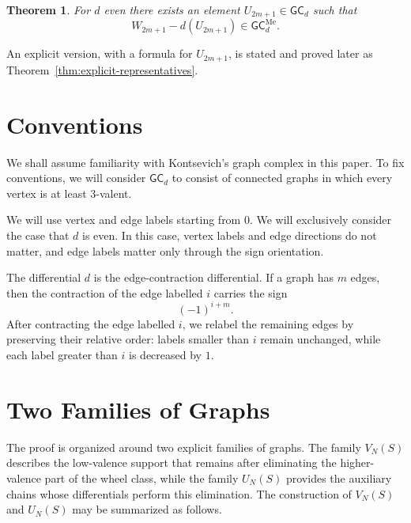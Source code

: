 \documentclass[11pt]{article}
\theoremstyle{definition}
\theoremstyle{plain}
\newtheorem*{maintheorem}{Theorem}
\newcommand{\GC}{\mathsf{GC}}
\begin{document}
\begin{maintheorem}
For $d$ even there exists an element $U_{2m+1} \in \GC_d$ such that
\[
W_{2m+1} -d(U_{2m+1})\in \GC_d^{\mathrm{Me}}.
\]
\end{maintheorem}

An explicit version, with a formula for $U_{2m+1}$, is stated and proved later as Theorem~\ref{thm:explicit-representatives}.

\section{Conventions}
We shall assume familiarity with Kontsevich's graph complex in this paper.
To fix conventions, we will consider $\GC_d$ to consist of connected graphs in which every vertex is at least $3$-valent.

We will use vertex and edge labels starting from $0$.
We will exclusively consider the case that $d$ is even. In this case, vertex labels and edge directions do not matter, and edge labels matter only through the sign orientation.

The differential $d$ is the edge-contraction differential. If a graph has $m$ edges, then the contraction of the edge labelled $i$ carries the sign
\[
(-1)^{i+m}.
\]
After contracting the edge labelled $i$, we relabel the remaining edges by preserving their relative order: labels smaller than $i$ remain unchanged, while each label greater than $i$ is decreased by $1$.


\section{Two Families of Graphs}
The proof is organized around two explicit families of graphs.
The family $V_N(S)$ describes the low-valence support that remains after eliminating the higher-valence part of the wheel class, while the family $U_N(S)$ provides the auxiliary chains whose differentials perform this elimination.
The construction of $V_N(S)$ and $U_N(S)$ may be summarized as follows.
\end{document}
